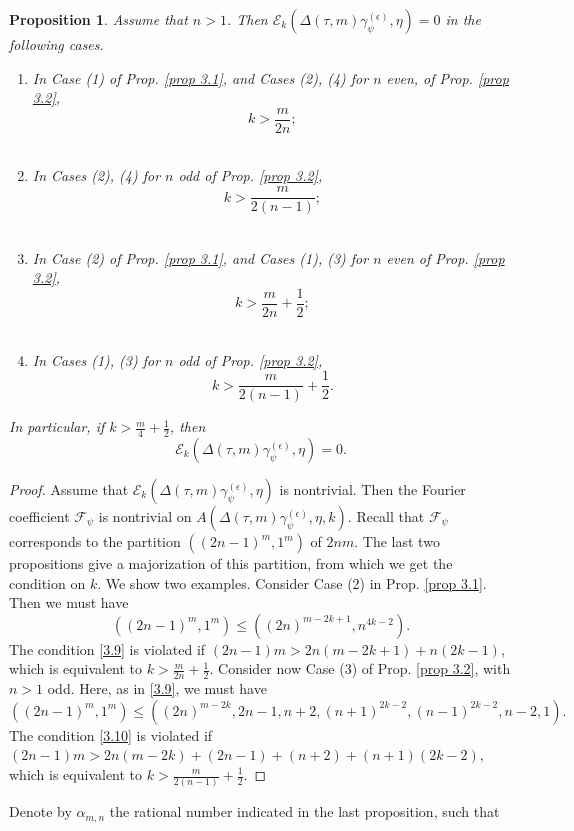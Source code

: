 \documentclass[12pts]{amsart}
\newtheorem{prop}[thm]{Proposition}
\begin{document}
\begin{prop}\label{prop 3.3}
Assume that $n>1$. Then $\mathcal{E}_k(\Delta(\tau,m)\gamma_\psi^{(\epsilon)},\eta)=0$ in the following cases.
\begin{enumerate}
	\item  In Case (1) of Prop. \ref{prop 3.1}, and Cases (2), (4) for $n$ even, of Prop. \ref{prop 3.2},
	$$
	k>\frac{m}{2n};
	$$ \\
	\item In Cases (2), (4) for $n$ odd of Prop. \ref{prop 3.2},
	$$
	k>\frac{m}{2(n-1)};
	$$\\
	\item In Case (2) of Prop. \ref{prop 3.1}, and Cases (1), (3) for $n$ even of Prop. \ref{prop 3.2}, 
	$$
	k>\frac{m}{2n}+\frac{1}{2};
	$$\\
	\item In Cases (1), (3) for $n$ odd of Prop. \ref{prop 3.2},
	$$
	k>\frac{m}{2(n-1)}+\frac{1}{2}.
	$$  
\end{enumerate}
In particular, if $k>\frac{m}{4}+\frac{1}{2}$, then
$$
\mathcal{E}_k(\Delta(\tau,m)\gamma_\psi^{(\epsilon)},\eta)=0.
$$
\end{prop}
\begin{proof}
Assume that $\mathcal{E}_k(\Delta(\tau,m)\gamma_\psi^{(\epsilon)},\eta)$ is nontrivial. Then the Fourier coefficient $\mathcal{F}_\psi$ is nontrivial on $A(\Delta(\tau,m)\gamma_\psi^{(\epsilon)},\eta, k)$. Recall that $\mathcal{F}_\psi$ corresponds to the partition $((2n-1)^m,1^m)$ of $2nm$. The last two propositions give a majorization of this partition, from which we get the condition on $k$. We show two examples. Consider Case (2) in Prop. \ref{prop 3.1}. Then we must have
\begin{equation}\label{3.9}
((2n-1)^m,1^m)\leq ((2n)^{m-2k+1},n^{4k-2}).
\end{equation}
The condition \eqref{3.9} is violated if $(2n-1)m>2n(m-2k+1)+n(2k-1)$,
which is equivalent to $k>\frac{m}{2n}+\frac{1}{2}$. Consider now Case (3) of Prop. \ref{prop 3.2}, with $n>1$ odd. Here, as in \eqref{3.9}, we must have 
\begin{equation}\label{3.10}
((2n-1)^m,1^m)\leq ((2n)^{m-2k},2n-1,n+2,(n+1)^{2k-2}, (n-1)^{2k-2},n-2,1).
\end{equation}
The condition \eqref{3.10} is violated if $(2n-1)m>2n(m-2k)+(2n-1)+(n+2)+(n+1)(2k-2)$,
which is equivalent to $k>\frac{m}{2(n-1)}+\frac{1}{2}$.
\end{proof}
Denote by $\alpha_{m,n}$ the rational number indicated in the last proposition, such that 
\end{document}
